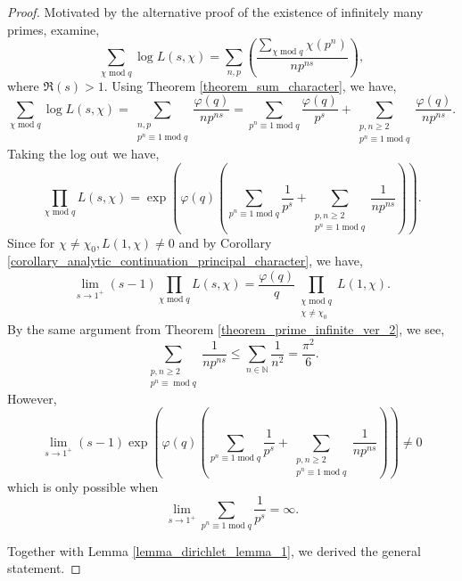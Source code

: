 \documentclass{article}
\DeclareMathOperator{\tmod}{mod}
\newcommand{\N}[0]{\mathbb{N}}
\begin{document}
\begin{proof}
  Motivated by the alternative proof of the existence of infinitely many primes, examine,
  \begin{equation*}
    \sum_{\chi\tmod q}\log L(s,\chi) = \sum_{n,p}\left({\frac {\sum_{\chi\tmod q} \chi(p^n)} {np^{ns}}}\right),
  \end{equation*}
  where $\Re(s)>1$. Using Theorem \ref{theorem_sum_character}, we have,
  \begin{equation*}
    \sum_{\chi\tmod q}\log L(s,\chi) = \sum_{\substack{n,p\\ p^n\equiv 1\tmod q}}{\frac {\varphi(q)} {np^{ns}}} = \sum_{p^n\equiv 1\tmod q}{\frac {\varphi(q)} {p^s}}+\sum_{\substack{p,n\geq2\\ p^n\equiv 1\tmod q}}{\frac {\varphi(q)} {np^{ns}}}.
  \end{equation*}
  Taking the log out we have,
  \begin{equation*}
    \prod_{\chi\tmod q}L(s,\chi) = \exp\left(\varphi(q)\left(\sum_{p^n\equiv 1\tmod q}{\frac {1} {p^s}}+\sum_{\substack{p,n\geq2\\ p^n\equiv 1\tmod q}}{\frac {1} {np^{ns}}}\right)\right).
  \end{equation*}
  Since for $\chi\not=\chi_0,L(1,\chi)\not=0$ and by Corollary \ref{corollary_analytic_continuation_principal_character}, we have,
  \begin{equation*}
    \lim_{s\to1^+}(s-1)\prod_{\chi\tmod q}L(s,\chi) = {\frac {\varphi(q)} q}\prod_{\substack{\chi\tmod q \\ \chi\not=\chi_0}}L(1,\chi).
  \end{equation*}
  By the same argument from Theorem \ref{theorem_prime_infinite_ver_2}, we see,
  \begin{equation*}
    \sum_{\substack{p,n\geq2\\p^n\equiv\tmod q}}{\frac 1 {np^{ns}}} \leq \sum_{n\in\N}{\frac 1 {n^2}} = {\frac {\pi^2} 6}.
  \end{equation*}
  However,
  \begin{equation*}
    \lim_{s\to1^+}(s-1)\exp\left(\varphi(q)\left(\sum_{p^n\equiv 1\tmod q}{\frac {1} {p^s}}+\sum_{\substack{p,n\geq2\\ p^n\equiv 1\tmod q}}{\frac {1} {np^{ns}}}\right)\right)\not=0
  \end{equation*}
  which is only possible when 
  \begin{equation*}
    \lim_{s\to1^+}\sum_{p^n\equiv 1\tmod q}{\frac 1 {p^s}} = \infty.
  \end{equation*}
  \par Together with Lemma \ref{lemma_dirichlet_lemma_1}, we derived the general statement.
\end{proof}
\end{document}
